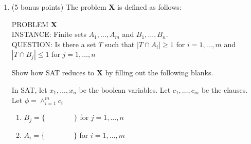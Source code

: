 \documentclass[11pt]{article}
\begin{document}
\begin{enumerate}
{\bf 3-Color}\\
INSTANCE: Graph $G=(V, E)$.\\
QUESTION: Can the nodes in $G$ be colored with up to 3 colors such that no two nodes connected by an edge are given the same color?

{\bf 4-Color}\\
INSTANCE: Graph $G=(V, E)$.\\
QUESTION: Can the nodes in $G$ be colored with up to 4 colors such that no two nodes connected by an edge are give the same color?

It is known that {\bf 3-Color} is NP-complete. Prove that {\bf 4-Color} is NP-complete in the following two steps.

\begin{enumerate}

\item Prove {\bf 4-Color} is in {\bf NP}. \newline 
Algorithm: \newline
For each node check each connecting edge. If any edge contains a node with the same color reject. Else continue on through the graph until you have visitied each node. \newline 
As you are visiting each node, make sure that there are 4 or less colors, if for any reason there is a fifth color we reject the graph since it is not 4-Color.  \newline 
Since there is a polynomial time solution we can say that 4-color is in NP.
\item Prove that {\bf 3-Color} reduces to {\bf 4-Color}.\newline
Say we have a graph that satifies 3-color, we call it C. C' will be created from the original C, where C' is 4-color. For each node in C we will add an edge that gives a node with a new color n. Since all the nodes will only add a node colored n, we know that it will satisfy 4-color and can simply be reversed to 3-color by taking out all nodes colored n. Since they can be worked back and forth we know that 3-color reduces to 4-color. 

\end{enumerate}


\item (5 bonus points) The problem {\bf X} is defined as follows:

PROBLEM {\bf X}\\
INSTANCE: Finite sets $A_1,\ldots,A_m$ and $B_1,\ldots,B_n$.\\
QUESTION: Is there a set $T$ such that $|T\cap A_i|\ge 1$ for $i=1,\ldots,m$ and $|T\cap B_j|\le 1$ for $j=1,\ldots,n$

Show how SAT reduces to {\bf X} by filling out the following blanks.

In SAT, let $x_1,\ldots,x_n$ be the boolean variables. Let $c_1,\ldots,c_m$ be the clauses. Let $\phi=\land_{i=1}^m c_i$
\begin{enumerate}
\item $B_j=\{\qquad\qquad\}$ for $j=1,\ldots,n$
\item $A_i=\{\qquad\qquad\}$ for $i=1,\ldots,m$
\end{enumerate}


\end{enumerate}
\end{document}
